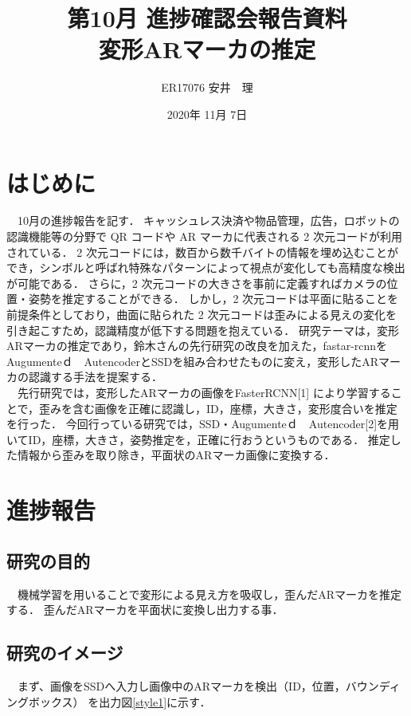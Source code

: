 \documentclass[11pt,a4j,ascmac]{jsarticle}
\title{第10月 進捗確認会報告資料\\
変形ARマーカの推定}
\author{ER17076 安井　理}
\date{2020年 11月 7日}
\begin{document}
\maketitle
\section{はじめに}
　10月の進捗報告を記す．
 キャッシュレス決済や物品管理，広告，ロボットの認識機能等の分野で QR コードや AR マーカに代表される 2 次元コードが利用されている．
2 次元コードには，数百から数千バイトの情報を埋め込むことができ，シンボルと呼ばれ特殊なパターンによって視点が変化しても高精度な検出が可能である．
さらに，2 次元コードの大きさを事前に定義すればカメラの位置・姿勢を推定することができる．
しかし，2 次元コードは平面に貼ることを前提条件としており，曲面に貼られた 2 次元コードは歪みによる見えの変化を引き起こすため，認識精度が低下する問題を抱えている．
研究テーマは，変形ARマーカの推定であり，鈴木さんの先行研究の改良を加えた，fastar-rcnnをAugumenteｄ　AutencoderとSSDを組み合わせたものに変え，変形したARマーカの認識する手法を提案する．\\

　先行研究では，変形したARマーカの画像をFasterRCNN[1] により学習することで，歪みを含む画像を正確に認識し，ID，座標，大きさ，変形度合いを推定を行った．
今回行っている研究では，SSD・Augumenteｄ　Autencoder[2]を用いてID，座標，大きさ，姿勢推定を，正確に行おうというものである．
推定した情報から歪みを取り除き，平面状のARマーカ画像に変換する．


\section{進捗報告}

\subsection{研究の目的}
　機械学習を用いることで変形による見え方を吸収し，歪んだARマーカを推定する．
歪んだARマーカを平面状に変換し出力する事．



\subsection{研究のイメージ}
　まず、画像をSSDへ入力し画像中のARマーカを検出（ID，位置，バウンディングボックス）
を出力図\ref{style1}に示す．
\end{document}
